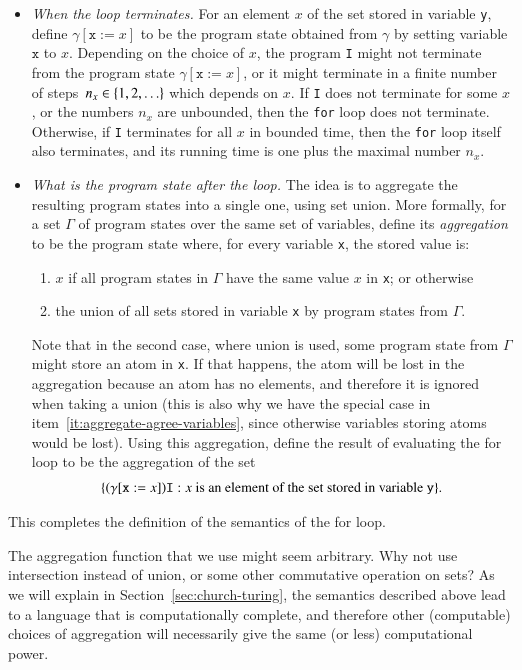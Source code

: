 \begin{itemize}
	\item \emph{When the loop terminates.} For an element $x$ of the set  stored in variable \texttt{y},  define $\gamma[\mathtt{x}:=x]$ to be the program state obtained from $\gamma$ by setting variable $\mathtt x$ to $x$.  Depending on the choice of $x$, the program \texttt{I} might  not terminate from the program state $\gamma[\mathtt{x}:=x]$, or it might terminate in a finite number of steps~$n_x \in \{1,2,\ldots\}$ which depends on $x$. If \texttt{I} does not terminate for some $x$, or the numbers $n_x$ are  unbounded, then the \texttt{for} loop does not terminate. Otherwise, if \texttt{I} terminates for all $x$ in bounded time, then the \texttt{for} loop itself also terminates, and its running time is one plus the maximal number $n_x$. 
	\item \emph{What is the program state after the loop.}   The idea is  to  aggregate the resulting program  states into a single one, using set union.  More formally, for a set   $\Gamma$ of program states over the same set of variables, define its \emph{aggregation} to be the program state where, for every variable \texttt{x}, the stored value is:
	\begin{enumerate}
		\item \label{it:aggregate-agree-variables}  $x$  if all program states in $\Gamma$ have the same value $x$ in \texttt{x}; or otherwise
		\item the union of all sets stored in variable \texttt{x} by program states from $\Gamma$.
	\end{enumerate}
	Note that in the second case, where union is used,  some program state from $\Gamma$ might store an atom in \texttt{x}. If that happens, the atom will be lost in the aggregation because an atom has no elements, and therefore it  is ignored when taking a union (this is also why we have the special case in item~\ref{it:aggregate-agree-variables}, since otherwise variables storing atoms would be lost). Using  this aggregation,  define the result of evaluating the for loop to be the aggregation of the set
	\begin{align*}
		\{ (\gamma[\mathtt{x}:=x]) \mathtt I : x \mbox{ is an element of the set stored in variable \texttt{y}}\}.
	\end{align*}
	\end{itemize}
	This completes the definition of the semantics of the for loop.


The aggregation function that we use might seem arbitrary. Why not use intersection instead of union, or some other commutative operation on sets? As we will explain in Section~\ref{sec:church-turing}, the semantics described above lead to a language that is computationally complete, and therefore other (computable) choices of aggregation will necessarily give the same (or less) computational power.

